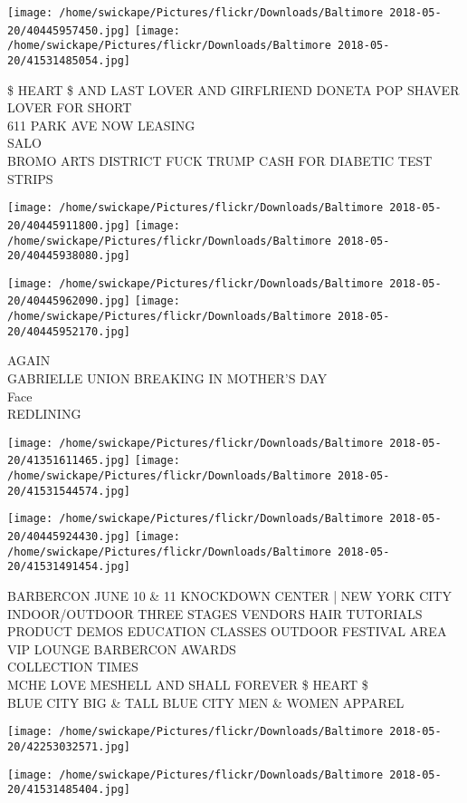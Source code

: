 \documentclass[10pt,letterpaper]{article}
\begin{document}
\texttt{[image: /home/swickape/Pictures/flickr/Downloads/Baltimore 2018-05-20/40445957450.jpg]}
\texttt{[image: /home/swickape/Pictures/flickr/Downloads/Baltimore 2018-05-20/41531485054.jpg]}

\$ HEART \$ AND LAST LOVER AND GIRFLRIEND DONETA POP SHAVER LOVER FOR SHORT\\
611 PARK AVE NOW LEASING\\
SALO\\
BROMO ARTS DISTRICT FUCK TRUMP CASH FOR DIABETIC TEST STRIPS
\pagebreak

\texttt{[image: /home/swickape/Pictures/flickr/Downloads/Baltimore 2018-05-20/40445911800.jpg]}
\texttt{[image: /home/swickape/Pictures/flickr/Downloads/Baltimore 2018-05-20/40445938080.jpg]}

\texttt{[image: /home/swickape/Pictures/flickr/Downloads/Baltimore 2018-05-20/40445962090.jpg]}
\texttt{[image: /home/swickape/Pictures/flickr/Downloads/Baltimore 2018-05-20/40445952170.jpg]}

AGAIN\\
GABRIELLE UNION BREAKING IN MOTHER'S DAY\\
Face\\
REDLINING
\pagebreak

\texttt{[image: /home/swickape/Pictures/flickr/Downloads/Baltimore 2018-05-20/41351611465.jpg]}
\texttt{[image: /home/swickape/Pictures/flickr/Downloads/Baltimore 2018-05-20/41531544574.jpg]}

\texttt{[image: /home/swickape/Pictures/flickr/Downloads/Baltimore 2018-05-20/40445924430.jpg]}
\texttt{[image: /home/swickape/Pictures/flickr/Downloads/Baltimore 2018-05-20/41531491454.jpg]}

BARBERCON JUNE 10 \& 11 KNOCKDOWN CENTER | NEW YORK CITY INDOOR/OUTDOOR THREE STAGES VENDORS HAIR TUTORIALS PRODUCT DEMOS EDUCATION CLASSES OUTDOOR FESTIVAL AREA VIP LOUNGE BARBERCON AWARDS\\
COLLECTION TIMES\\
MCHE LOVE MESHELL AND SHALL FOREVER \$ HEART \$\\
BLUE CITY BIG \& TALL BLUE CITY MEN \& WOMEN APPAREL
\pagebreak

\texttt{[image: /home/swickape/Pictures/flickr/Downloads/Baltimore 2018-05-20/42253032571.jpg]}

\vspace{0.25in}
\texttt{[image: /home/swickape/Pictures/flickr/Downloads/Baltimore 2018-05-20/41531485404.jpg]}
\end{document}
